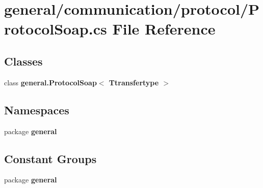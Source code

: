 \section{general/communication/protocol/\-Protocol\-Soap.cs File Reference}
\label{_protocol_soap_8cs}
\subsection*{Classes}
\begin{DoxyCompactItemize}
\item 
class {\bf general.\-Protocol\-Soap$<$ Ttransfertype $>$}
\end{DoxyCompactItemize}
\subsection*{Namespaces}
\begin{DoxyCompactItemize}
\item 
package {\bf general}
\end{DoxyCompactItemize}
\subsection*{Constant Groups}
\begin{DoxyCompactItemize}
\item 
package {\bf general}
\end{DoxyCompactItemize}
